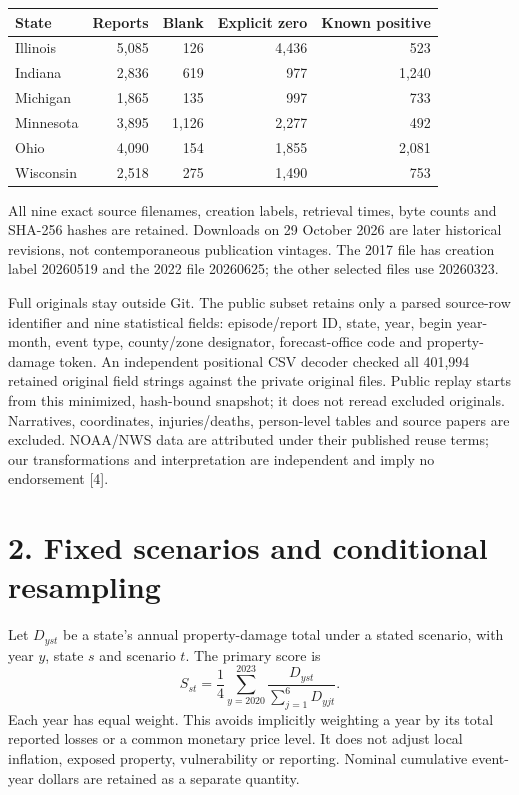 \documentclass[11pt,letterpaper]{article}
\begin{document}
\begin{center}\small
\begin{tabular}{lrrrr}\toprule
State & Reports & Blank & Explicit zero & Known positive\\\midrule
Illinois & 5,085 & 126 & 4,436 & 523\\
Indiana & 2,836 & 619 & 977 & 1,240\\
Michigan & 1,865 & 135 & 997 & 733\\
Minnesota & 3,895 & 1,126 & 2,277 & 492\\
Ohio & 4,090 & 154 & 1,855 & 2,081\\
Wisconsin & 2,518 & 275 & 1,490 & 753\\\bottomrule
\end{tabular}
\end{center}

All nine exact source filenames, creation labels, retrieval times, byte counts and SHA-256 hashes are retained. Downloads on 29 October 2026 are later historical revisions, not contemporaneous publication vintages. The 2017 file has creation label 20260519 and the 2022 file 20260625; the other selected files use 20260323.

Full originals stay outside Git. The public subset retains only a parsed source-row identifier and nine statistical fields: episode/report ID, state, year, begin year-month, event type, county/zone designator, forecast-office code and property-damage token. An independent positional CSV decoder checked all 401,994 retained original field strings against the private original files. Public replay starts from this minimized, hash-bound snapshot; it does not reread excluded originals. Narratives, coordinates, injuries/deaths, person-level tables and source papers are excluded. NOAA/NWS data are attributed under their published reuse terms; our transformations and interpretation are independent and imply no endorsement [4].

\newpage
\section*{2. Fixed scenarios and conditional resampling}
Let $D_{yst}$ be a state's annual property-damage total under a stated scenario, with year $y$, state $s$ and scenario $t$. The primary score is
\[
 S_{st}=\frac{1}{4}\sum_{y=2020}^{2023}
        \frac{D_{yst}}{\sum_{j=1}^{6}D_{yjt}}.
\]
Each year has equal weight. This avoids implicitly weighting a year by its total reported losses or a common monetary price level. It does not adjust local inflation, exposed property, vulnerability or reporting. Nominal cumulative event-year dollars are retained as a separate quantity.
\end{document}
